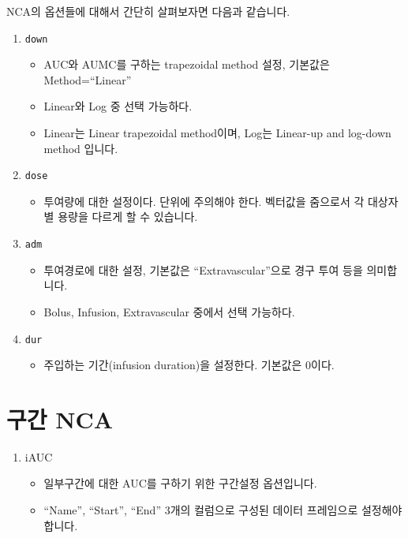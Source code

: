 \documentclass[12pt,]{krantz}
\providecommand{\tightlist}{%
  \setlength{\itemsep}{0pt}\setlength{\parskip}{0pt}}
\theoremstyle{definition}
\theoremstyle{definition}
\theoremstyle{definition}
\theoremstyle{remark}
\begin{document}
NCA의 옵션들에 대해서 간단히 살펴보자면 다음과 같습니다.

\begin{enumerate}
\def\labelenumi{\arabic{enumi}.}
\tightlist
\item
  \texttt{down}

  \begin{itemize}
  \tightlist
  \item
    AUC와 AUMC를 구하는 trapezoidal method 설정, 기본값은
    Method=``Linear''
  \item
    Linear와 Log 중 선택 가능하다.
  \item
    Linear는 Linear trapezoidal method이며, Log는 Linear-up and log-down
    method 입니다.
  \end{itemize}
\item
  \texttt{dose}

  \begin{itemize}
  \tightlist
  \item
    투여량에 대한 설정이다. 단위에 주의해야 한다. 벡터값을 줌으로서 각
    대상자별 용량을 다르게 할 수 있습니다.
  \end{itemize}
\item
  \texttt{adm}

  \begin{itemize}
  \tightlist
  \item
    투여경로에 대한 설정, 기본값은 ``Extravascular''으로 경구 투여 등을
    의미합니다.
  \item
    Bolus, Infusion, Extravascular 중에서 선택 가능하다.
  \end{itemize}
\item
  \texttt{dur}

  \begin{itemize}
  \tightlist
  \item
    주입하는 기간(infusion duration)을 설정한다. 기본값은 0이다.
  \end{itemize}
\end{enumerate}

\section{구간 NCA}\label{interval-NCA}

\begin{enumerate}
\def\labelenumi{\arabic{enumi}.}
\tightlist
\item
  iAUC

  \begin{itemize}
  \tightlist
  \item
    일부구간에 대한 AUC를 구하기 위한 구간설정 옵션입니다.
  \item
    ``Name'', ``Start'', ``End'' 3개의 컬럼으로 구성된 데이터 프레임으로
    설정해야 합니다.
  \end{itemize}
\end{enumerate}
\end{document}

